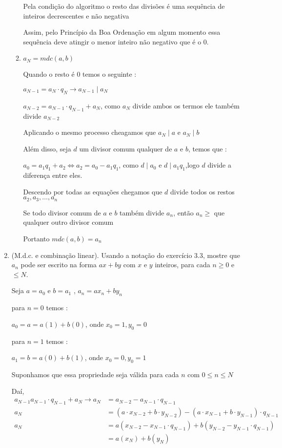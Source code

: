 \documentclass[a4paper,12pt]{article}
\begin{document}
\begin{enumerate}[label=3.\arabic*.]
\begin{enumerate}[label=\Roman*.]
        Pela condição do algoritmo o resto das divisões é uma sequência de inteiros 
        decrescentes e não negativa

        Assim, pelo Princípio da Boa Ordenação em algum momento essa sequência 
        deve atingir o menor inteiro não negativo que é o $0$.
        
        \item $a_N = mdc(a,b)$
    
        Quando o resto é $0$ temos o seguinte : 

        $a_{N-1} = a_N \cdot q_N \rightarrow a_{N-1} \mid a_N $

        $a_{N-2} = a_{N-1} \cdot q_{N-1} + a_N$, como $a_N$ divide ambos os termos ele também divide $a_{N-2}$

        Aplicando o mesmo processo cheagamos que $a_N \mid a$ e $a_N \mid b$

        Além disso, seja $d$ um divisor comum qualquer de $a$ e $b$, temos que : 

        $a_0 = a_1 q_1 + a_2 \Leftrightarrow a_2 = a_0 - a_1 q_1$, como $d \mid a_0$ e $d \mid a_1q_1$,logo 
        $d$ divide a diferença entre eles.

        Descendo por todas as equações chegamos que $d$ divide todos os restos $a_2,a_3,\ldots,a_n$

        Se todo divisor comum de $a$ e $b$ também divide $a_n$, então $a_n \ge$ que qualquer outro divisor comum

        Portanto $mdc(a,b) = a_n$

    \end{enumerate}

    \item (M.d.c. e combinação linear). Usando a notação do exercício 3.3, mostre que $a_n$ 
    pode ser escrito na forma $ax + by$ com $x$ e $y$ inteiros, para cada $n \geq 0$ e $\leq N$.
    
    Seja $a = a_0$ e $b = a_1$ , $a_n = ax_n + by_n$ 
    
    para $n = 0$ temos :
    
    $a_0 = a = a(1) + b(0)$, onde $x_0 = 1, y_0 = 0$

    para $n = 1$ temos :
    
    $a_1 = b = a(0) + b(1)$, onde $x_0 = 0, y_0 = 1$

    Suponhamos que essa propriedade seja válida para cada $n$ com $0 \leq n \leq N$

    Daí,
    \begin{align*}
        a_{N-1} a_{N-1} \cdot q_{N-1} + a_N \rightarrow a_{N} &= a_{N-2} - a_{N-1} \cdot q_{N-1}\\
        a_N &= (a \cdot x_{N-2} + b \cdot y_{N-2}) - (a \cdot x_{N-1} + b \cdot y_{N-1}) \cdot q_{N-1} \\
        a_N &= a(x_{N-2} - x_{N-1} \cdot q_{N-1}) + b(y_{N-2} - y_{N-1} \cdot q_{N-1}) \\
        &= a(x_N) + b(y_N)
    \end{align*}


\end{enumerate}
\end{document}
